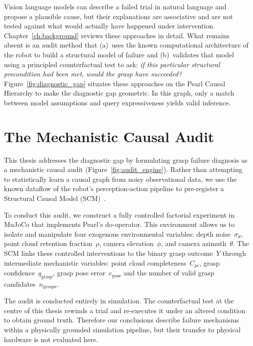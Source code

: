\documentclass[11pt,a4paper]{report}
\begin{document}
\noindent Vision language models can describe a failed trial in natural language and propose a plausible cause, but their explanations are associative and are not tested against what would actually have happened under intervention. Chapter~\ref{ch:background} reviews these approaches in detail. What remains absent is an audit method that (a)~uses the known computational architecture of the robot to build a structural model of failure and (b)~validates that model using a principled counterfactual test to ask: \emph{if this particular structural precondition had been met, would the grasp have succeeded?} Figure~\ref{fig:diagnostic_gap} situates these approaches on the Pearl Causal Hierarchy to make the diagnostic gap geometric. In this graph, only a match between model assumptions and query expressiveness yields valid inference.

\section{The Mechanistic Causal Audit}
\label{sec:approach}

This thesis addresses the diagnostic gap by formulating grasp failure diagnosis as a mechanistic causal audit (Figure~\ref{fig:audit_engine}). Rather than attempting to statistically learn a causal graph from noisy observational data, we use the known dataflow of the robot's perception-action pipeline to pre-register a Structural Causal Model (SCM)~\cite{pearl2009causality}.

\noindent To conduct this audit, we construct a fully controlled factorial experiment in MuJoCo that implements Pearl's do-operator. This environment allows us to isolate and manipulate four exogenous environmental variables: depth noise~$\sigma_d$, point cloud retention fraction~$\rho$, camera elevation~$\phi$, and camera azimuth~$\theta$. The SCM links these controlled interventions to the binary grasp outcome~$Y$ through intermediate mechanistic variables: point cloud completeness~$C_{pc}$, grasp confidence~$q_{\text{grasp}}$, grasp pose error~$e_{\text{pose}}$ and the number of valid grasp candidates~$n_{\text{grasps}}$.

\noindent The audit is conducted entirely in simulation. The counterfactual test at the centre of this thesis rewinds a trial and re-executes it under an altered condition to obtain ground truth. Therefore our conclusions describe failure mechanisms within a physically grounded simulation pipeline, but their transfer to physical hardware is not evaluated here.
\end{document}
